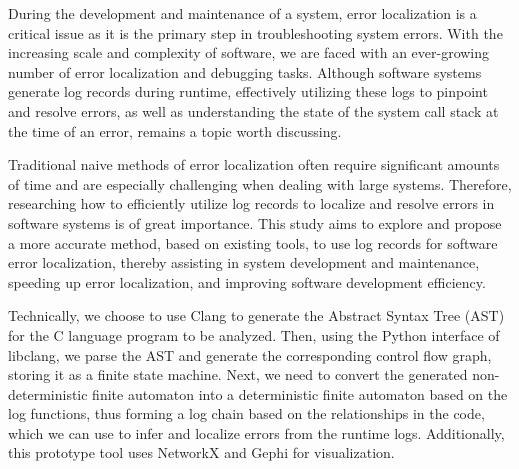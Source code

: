\documentclass[
     oneside,                %
  ]{njuthesis}
\begin{document}
\begin{abstract*}
During the development and maintenance of a system, error localization is a critical issue as it is the primary step in troubleshooting system errors. With the increasing scale and complexity of software, we are faced with an ever-growing number of error localization and debugging tasks. Although software systems generate log records during runtime, effectively utilizing these logs to pinpoint and resolve errors, as well as understanding the state of the system call stack at the time of an error, remains a topic worth discussing.

Traditional naive methods of error localization often require significant amounts of time and are especially challenging when dealing with large systems. Therefore, researching how to efficiently utilize log records to localize and resolve errors in software systems is of great importance. This study aims to explore and propose a more accurate method, based on existing tools, to use log records for software error localization, thereby assisting in system development and maintenance, speeding up error localization, and improving software development efficiency.

Technically, we choose to use Clang to generate the Abstract Syntax Tree (AST) for the C language program to be analyzed. Then, using the Python interface of libclang, we parse the AST and generate the corresponding control flow graph, storing it as a finite state machine. Next, we need to convert the generated non-deterministic finite automaton into a deterministic finite automaton based on the log functions, thus forming a log chain based on the relationships in the code, which we can use to infer and localize errors from the runtime logs. Additionally, this prototype tool uses NetworkX and Gephi for visualization.
\end{abstract*}

\tableofcontents

\mainmatter

\end{document}
